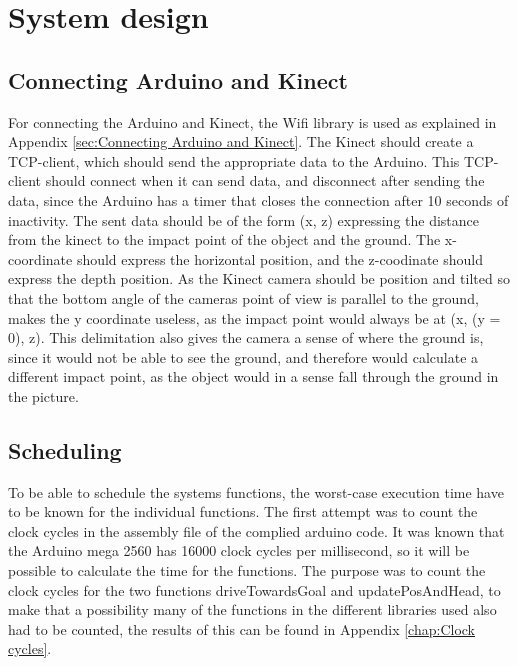 \section{System design}
\label{sec:i3System design}

\subsection{Connecting Arduino and Kinect}
\label{sec:i3Connecting Arduino and Kinect system design}
For connecting the Arduino and Kinect, the Wifi library is used as explained in Appendix \ref{sec:Connecting Arduino and Kinect}. The Kinect should create a TCP-client, which should send the appropriate data to the Arduino. This TCP-client should connect when it can send data, and disconnect after sending the data, since the Arduino has a timer that closes the connection after 10 seconds of inactivity. The sent data should be of the form (x, z) expressing the distance from the kinect to the impact point of the object and the ground. The x-coordinate should express the horizontal position, and the z-coodinate should express the depth position. As the Kinect camera should be position and tilted so that the bottom angle of the cameras point of view is parallel to the ground, makes the y coordinate useless, as the impact point would always be at (x, (y = 0), z). This delimitation also gives the camera a sense of where the ground is, since it would not be able to see the ground, and therefore would calculate a different impact point, as the object would in a sense fall through the ground in the picture. 

\subsection{Scheduling}
\label{sec:i3Scheduling}
To be able to schedule the systems functions, the worst-case execution time have to be known for the individual functions. The first attempt was to count the clock cycles in the assembly file of the complied arduino code. It was known that the Arduino mega 2560 has 16000 clock cycles per millisecond, so it will be possible to calculate the time for the functions. The purpose was to count the clock cycles for the two functions driveTowardsGoal and updatePosAndHead, to make that a possibility many of the functions in the different libraries used also had to be counted, the results of this can be found in Appendix \ref{chap:Clock cycles}.

